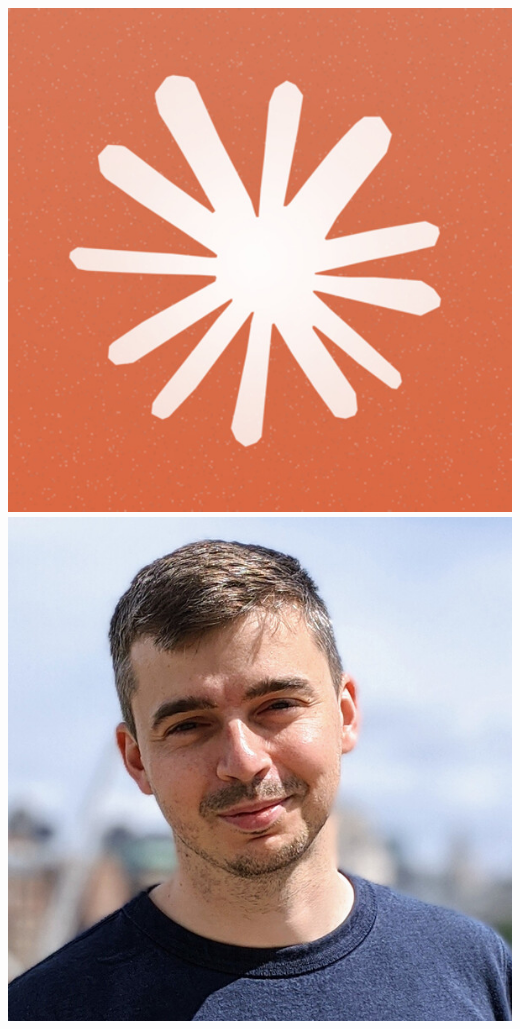 \documentclass[aspectratio=169]{beamer}
\begin{document}
\begin{frame}
{        \includegraphics[width=0.06\textheight]{people/claude.jpg}%
        \includegraphics[width=0.06\textheight]{people/david_yallup.jpg}%
}
\end{frame}
\end{document}
